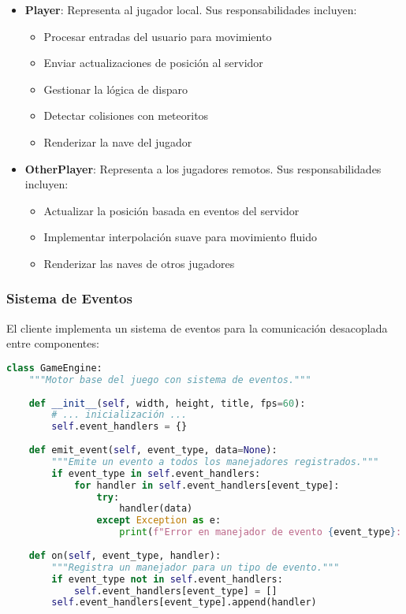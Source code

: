 \documentclass[12pt,letterpaper]{article}
\begin{document}
\begin{itemize}
    \item \textbf{Player}: Representa al jugador local. Sus responsabilidades incluyen:
    \begin{itemize}
        \item Procesar entradas del usuario para movimiento
        \item Enviar actualizaciones de posición al servidor
        \item Gestionar la lógica de disparo
        \item Detectar colisiones con meteoritos
        \item Renderizar la nave del jugador
    \end{itemize}
    
    \item \textbf{OtherPlayer}: Representa a los jugadores remotos. Sus responsabilidades incluyen:
    \begin{itemize}
        \item Actualizar la posición basada en eventos del servidor
        \item Implementar interpolación suave para movimiento fluido
        \item Renderizar las naves de otros jugadores
    \end{itemize}
\end{itemize}

\subsubsection{Sistema de Eventos}

El cliente implementa un sistema de eventos para la comunicación desacoplada entre componentes:

\begin{lstlisting}[language=python, caption=Implementación del sistema de eventos]
class GameEngine:
    """Motor base del juego con sistema de eventos."""
    
    def __init__(self, width, height, title, fps=60):
        # ... inicialización ...
        self.event_handlers = {}
    
    def emit_event(self, event_type, data=None):
        """Emite un evento a todos los manejadores registrados."""
        if event_type in self.event_handlers:
            for handler in self.event_handlers[event_type]:
                try:
                    handler(data)
                except Exception as e:
                    print(f"Error en manejador de evento {event_type}: {e}")
    
    def on(self, event_type, handler):
        """Registra un manejador para un tipo de evento."""
        if event_type not in self.event_handlers:
            self.event_handlers[event_type] = []
        self.event_handlers[event_type].append(handler)
\end{lstlisting}
\end{document}
